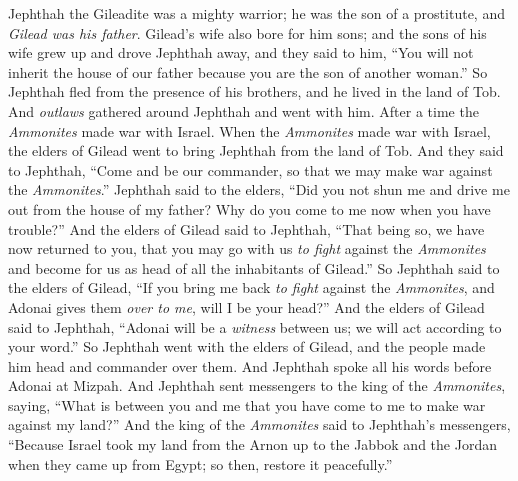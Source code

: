 \begin{biblechapter} %
 Jephthah the Gileadite was a mighty warrior; he was the son of a prostitute, and \textit{Gilead was his father}.
\verse Gilead’s wife also bore for him sons; and the sons of his wife grew up and drove Jephthah away, and they said to him, “You will not inherit the house of our father because you are the son of another woman.”
\verse So Jephthah fled from the presence of his brothers, and he lived in the land of Tob. And \textit{outlaws} gathered around Jephthah and went with him.
\verse After a time the \textit{Ammonites} made war with Israel.
\verse When the \textit{Ammonites} made war with Israel, the elders of Gilead went to bring Jephthah from the land of Tob.
\verse And they said to Jephthah, “Come and be our commander, so that we may make war against the \textit{Ammonites}.”
\verse Jephthah said to the elders, “Did you not shun me and drive me out from the house of my father? Why do you come to me now when you have trouble?”
\verse And the elders of Gilead said to Jephthah, “That being so, we have now returned to you, that you may go with us \textit{to fight} against the \textit{Ammonites} and become for us as head of all the inhabitants of Gilead.”
\verse So Jephthah said to the elders of Gilead, “If you bring me back \textit{to fight} against the \textit{Ammonites}, and Adonai gives them \textit{over to me}, will I be your head?”
\verse And the elders of Gilead said to Jephthah, “Adonai will be a \textit{witness} between us; we will act according to your word.”
\verse So Jephthah went with the elders of Gilead, and the people made him head and commander over them. And Jephthah spoke all his words before Adonai at Mizpah.
\verse And Jephthah sent messengers to the king of the \textit{Ammonites}, saying, “What is between you and me that you have come to me to make war against my land?”
\verse And the king of the \textit{Ammonites} said to Jephthah’s messengers, “Because Israel took my land from the Arnon up to the Jabbok and the Jordan when they came up from Egypt; so then, restore it peacefully.”

\end{biblechapter}
